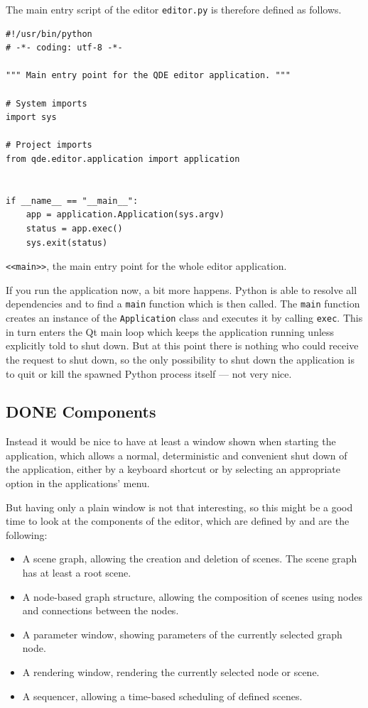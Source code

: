 \documentclass[10pt, openright, notitlepage]{scrreprt}
\begin{document}
The main entry script of the editor \texttt{editor.py} is therefore defined as follows.

\begin{listing}[H]
\begin{verbatim}
#!/usr/bin/python
# -*- coding: utf-8 -*-

""" Main entry point for the QDE editor application. """

# System imports
import sys

# Project imports
from qde.editor.application import application


if __name__ == "__main__":
    app = application.Application(sys.argv)
    status = app.exec()
    sys.exit(status)
\end{verbatim}
\caption{\label{main}
\texttt{<<main>>}, the main entry point for the whole editor application.}
\end{listing}

If you run the application now, a bit more happens. Python is able to
resolve all dependencies and to find a \texttt{main} function which is then called.
The \texttt{main} function creates an instance of the \texttt{Application} class and executes
it by calling \texttt{exec}. This in turn enters the Qt main loop which keeps the
application running unless explicitly told to shut down. But at this point there
is nothing who could receive the request to shut down, so the only possibility
to shut down the application is to quit or kill the spawned Python process
itself --- not very nice.
\subsection{{\bfseries\sffamily DONE} Components}
\label{sec:components}
Instead it would be nice to have at least a window shown when starting the
application, which allows a normal, deterministic and convenient shut down of
the application, either by a keyboard shortcut or by selecting an appropriate
option in the applications' menu.

But having only a plain window is not that interesting, so this might be a good
time to look at the components of the editor, which are defined by
\citep[p. 29 ff.]{osterwalder_qde_2016} and are the following:

\begin{itemize}
\item A scene graph, allowing the creation and deletion of scenes. The scene graph
has at least a root scene.
\item A node-based graph structure, allowing the composition of scenes using nodes
and connections between the nodes.
\item A parameter window, showing parameters of the currently selected graph node.
\item A rendering window, rendering the currently selected node or scene.
\item A sequencer, allowing a time-based scheduling of defined scenes.
\end{itemize}
\end{document}
